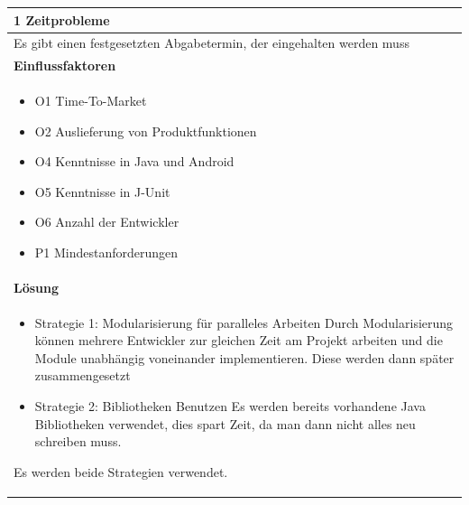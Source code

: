 \documentclass[fontsize=12pt,paper=a4,twoside]{scrartcl}
\begin{document}
\begin{table}[H]
\begin{tabular}{|p{\textwidth}|}\hline
1 Zeitprobleme\\ \hline
Es gibt einen festgesetzten Abgabetermin, der eingehalten werden muss\\ \hline
\textbf{Einflussfaktoren}\\
\begin{itemize}
\item O1 Time-To-Market
\item O2 Auslieferung von Produktfunktionen
\item O4 Kenntnisse in Java  und Android
\item O5 Kenntnisse in J-Unit
\item O6 Anzahl der Entwickler
\item P1 Mindestanforderungen
\end{itemize}\\ \hline
\textbf{Lösung}\\
\begin{itemize}
\item Strategie 1: Modularisierung für paralleles Arbeiten \leavevmode\newline
Durch Modularisierung können mehrere Entwickler zur gleichen Zeit am Projekt arbeiten und die Module unabhängig voneinander implementieren. Diese werden dann später zusammengesetzt 
\item Strategie 2: Bibliotheken Benutzen \leavevmode\newline
Es werden bereits vorhandene Java Bibliotheken verwendet, dies spart Zeit, da man dann nicht alles neu schreiben muss.
\end{itemize}
Es werden beide Strategien verwendet.\\ \hline
\end{tabular}
\end{table}
\end{document}

